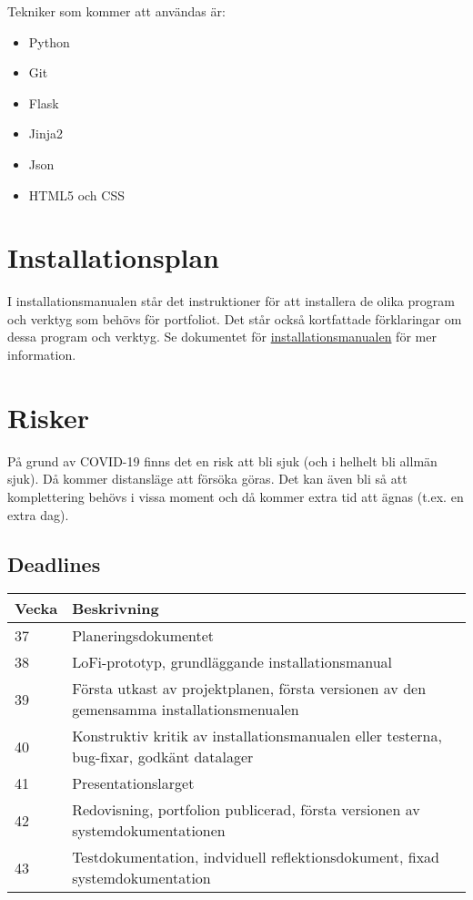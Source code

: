 \documentclass{TDP003mall}
\begin{document}
Tekniker som kommer att användas är:

\begin{itemize}
\item
  Python
\item
  Git
\item
  Flask
\item
  Jinja2
\item
  Json
\item
  HTML5 och CSS
\end{itemize}

\section{Installationsplan}
I installationsmanualen står det instruktioner för att installera de olika program och verktyg som behövs för portfoliot. Det står också kortfattade förklaringar om dessa program och verktyg. Se dokumentet för \href{https://gitlab.liu.se/tdp003_2020/tdp003_2020_installationsmanual/-/blob/development_stage/installationsmanual.pdf}{installationsmanualen} för mer information.

\section{Risker}
På grund av COVID-19 finns det en risk att bli sjuk (och i helhelt bli allmän sjuk). Då kommer distansläge att försöka göras. Det kan även bli så att komplettering behövs i vissa moment och då kommer extra tid att ägnas (t.ex. en extra dag).

\subsection{Deadlines}
\begin{table}[!h]
\begin{tabularx}{\linewidth}{|l|X|}
\hline
Vecka & Beskrivning \\\hline
37 & Planeringsdokumentet \\\hline
38 & LoFi-prototyp, grundläggande installationsmanual \\\hline
39 & Första utkast av projektplanen, första versionen av den gemensamma installationsmenualen \\\hline
40 & Konstruktiv kritik av installationsmanualen eller testerna, bug-fixar, godkänt datalager \\\hline
41 & Presentationslarget \\\hline
42 & Redovisning, portfolion publicerad, första versionen av systemdokumentationen \\\hline
43 & Testdokumentation, indviduell reflektionsdokument, fixad systemdokumentation \\\hline
\end{tabularx}
\end{table}
\end{document}
